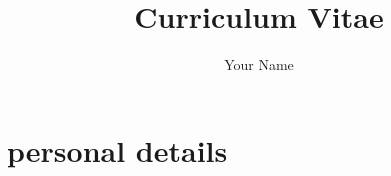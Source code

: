 \documentclass[a4paper, 11pt]{article}
\begin{document}




	\title{Curriculum Vitae}
	\author{Your Name}

	\def \cvscaleazero{none}
	\def \cvscaleaone{poor}
	\def \cvscaleatwo{bad}
	\def \cvscaleathree{extensible}
	\def \cvscaleafour{ok}
	\def \cvscaleafive{mediocre}
	\def \cvscaleasix{skilled}
	\def \cvscaleaseven{good}
	\def \cvscaleaeight{very good}
	\def \cvscaleanine{professional}
	\def \cvscaleaten{very professional}



	\selectfont
    \linespread{1.25}
	\graphicspath{ {./img/} }



    \maketitle



	\section{personal details}

\end{document}
